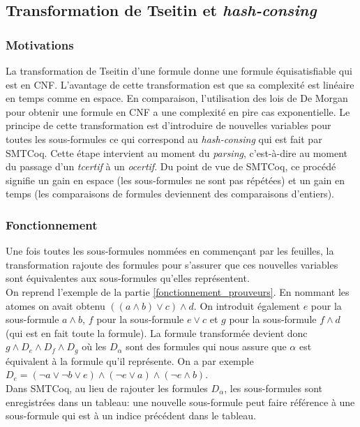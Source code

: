 \documentclass[11pt]{article}
\begin{document}
\subsection{Transformation de Tseitin et \textit{hash-consing}} \label{tseitin}

\subsubsection{Motivations}

La transformation de Tseitin d'une formule donne une formule équisatisfiable qui est en CNF. L'avantage de cette transformation est que sa complexité est linéaire en temps comme en espace. En comparaison, l'utilisation des lois de De Morgan pour obtenir une formule en CNF a une complexité en pire cas exponentielle. Le principe de cette transformation est d'introduire de nouvelles variables pour toutes les sous-formules ce qui correspond au \textit{hash-consing} qui est fait par SMTCoq. Cette étape intervient au moment du \textit{parsing}, c'est-à-dire au moment du passage d'un \textit{tcertif} à un \textit{ocertif}. Du point de vue de SMTCoq, ce procédé signifie un gain en espace (les sous-formules ne sont pas répétées) et un gain en temps (les comparaisons de formules deviennent des comparaisons d'entiers).

\subsubsection{Fonctionnement}

Une fois toutes les sous-formules nommées en commençant par les feuilles, la transformation rajoute des formules pour s'assurer que ces nouvelles variables sont équivalentes aux sous-formules qu'elles représentent. \\

On reprend l'exemple de la partie \ref{fonctionnement_prouveurs}. En nommant les atomes on avait obtenu  $((a \wedge b) \vee c) \wedge d$. On introduit également $e$ pour la sous-formule $a \wedge b$, $f$ pour la sous-formule $e \vee c$ et $g$ pour la sous-formule $f \wedge d$ (qui est en fait toute la formule). La formule transformée devient donc $g \wedge D_e \wedge D_f \wedge D_g$ où les $D_\alpha$ sont des formules qui nous assure que $\alpha$ est équivalent à la formule qu'il représente. On a par exemple $D_e = (\neg a \vee \neg b \vee e) \wedge (\neg e \vee a) \wedge (\neg e \wedge b)$. \\

Dans SMTCoq, au lieu de rajouter les formules $D_\alpha$, les sous-formules sont enregistrées dans un tableau: une nouvelle sous-formule peut faire référence à une sous-formule qui est à un indice précédent dans le tableau. 
\end{document}
